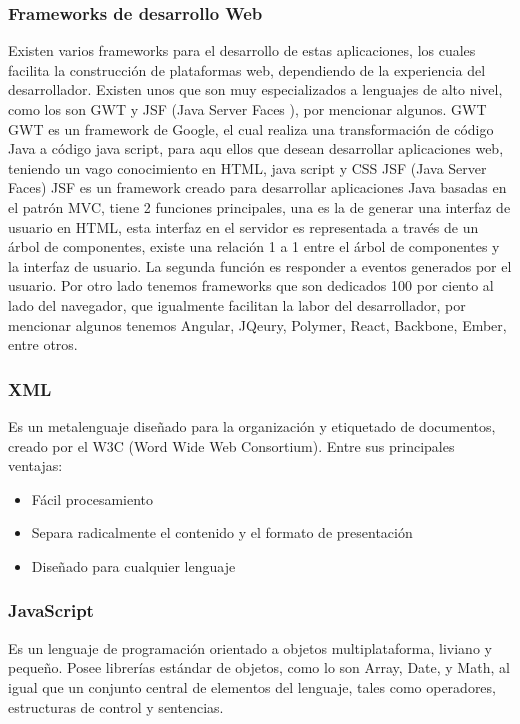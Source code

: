 \subsubsection{Frameworks de desarrollo Web}
Existen varios frameworks para el desarrollo de estas aplicaciones, los cuales facilita la construcción de plataformas web, dependiendo de la experiencia del desarrollador. Existen unos que son muy especializados a lenguajes de alto nivel, como los son GWT y JSF (Java Server Faces \cite{id3}), por mencionar algunos.
\newline
GWT
\newline
GWT es un framework de Google, el cual realiza una transformación de código Java a código java script, para aqu
ellos que desean desarrollar aplicaciones web, teniendo un vago conocimiento en HTML, java script y CSS
\newline
JSF (Java Server Faces)
\newline
JSF es un framework creado para desarrollar aplicaciones Java basadas en el patrón MVC, tiene 2 funciones principales, una es la de generar una interfaz de usuario en HTML, esta interfaz en el servidor es representada a través de un árbol de componentes, existe una relación 1 a 1 entre el árbol de componentes y la interfaz de usuario. La segunda función es responder a eventos generados por el usuario.
\newline
Por otro lado tenemos frameworks que son dedicados 100 por ciento al lado del navegador, que igualmente facilitan la labor del desarrollador, por mencionar algunos tenemos Angular, JQeury, Polymer, React, Backbone, Ember, entre otros.
\subsubsection{XML}
Es un metalenguaje diseñado para la organización y etiquetado de documentos, creado por el W3C (Word Wide Web Consortium). Entre sus principales ventajas:
\begin{itemize}
    \item Fácil procesamiento
    \item Separa radicalmente el contenido y el formato de presentación
    \item Diseñado para cualquier lenguaje
\end{itemize}
\subsubsection{JavaScript}
Es un lenguaje de programación orientado a objetos multiplataforma, liviano y pequeño. Posee librerías estándar de objetos, como lo son Array, Date, y Math, al igual que un conjunto central de elementos del lenguaje, tales como operadores, estructuras de control y sentencias.
